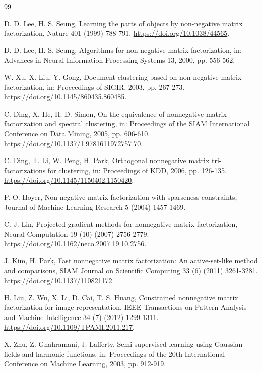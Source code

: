 \documentclass[preprint,12pt]{elsarticle}
\theoremstyle{remark}
\begin{document}
\begin{thebibliography}{99}

D. D. Lee, H. S. Seung, Learning the parts of objects by non-negative matrix factorization,
Nature 401 (1999) 788-791. \url{https://doi.org/10.1038/44565}.

D. D. Lee, H. S. Seung, Algorithms for non-negative matrix factorization,
in: Advances in Neural Information Processing Systems 13, 2000, pp. 556-562.

W. Xu, X. Liu, Y. Gong, Document clustering based on non-negative matrix factorization,
in: Proceedings of SIGIR, 2003, pp. 267-273. \url{https://doi.org/10.1145/860435.860485}.

C. Ding, X. He, H. D. Simon, On the equivalence of nonnegative matrix factorization and spectral clustering,
in: Proceedings of the SIAM International Conference on Data Mining, 2005, pp. 606-610.
\url{https://doi.org/10.1137/1.9781611972757.70}.

C. Ding, T. Li, W. Peng, H. Park, Orthogonal nonnegative matrix tri-factorizations for clustering,
in: Proceedings of KDD, 2006, pp. 126-135. \url{https://doi.org/10.1145/1150402.1150420}.

P. O. Hoyer, Non-negative matrix factorization with sparseness constraints,
Journal of Machine Learning Research 5 (2004) 1457-1469.

C.-J. Lin, Projected gradient methods for nonnegative matrix factorization,
Neural Computation 19 (10) (2007) 2756-2779. \url{https://doi.org/10.1162/neco.2007.19.10.2756}.

J. Kim, H. Park, Fast nonnegative matrix factorization: An active-set-like method and comparisons,
SIAM Journal on Scientific Computing 33 (6) (2011) 3261-3281.
\url{https://doi.org/10.1137/110821172}.

H. Liu, Z. Wu, X. Li, D. Cai, T. S. Huang, Constrained nonnegative matrix factorization for image representation,
IEEE Transactions on Pattern Analysis and Machine Intelligence 34 (7) (2012) 1299-1311.
\url{https://doi.org/10.1109/TPAMI.2011.217}.

X. Zhu, Z. Ghahramani, J. Lafferty, Semi-supervised learning using Gaussian fields and harmonic functions,
in: Proceedings of the 20th International Conference on Machine Learning, 2003, pp. 912-919.


\end{thebibliography}
\end{document}
